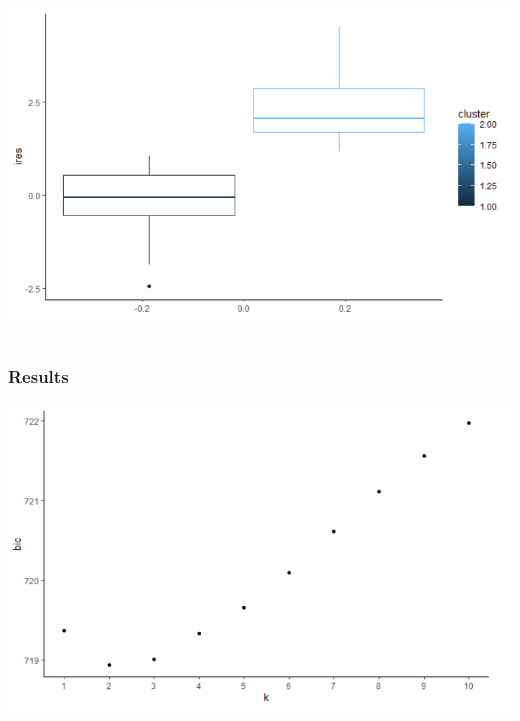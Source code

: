 \documentclass[hyperref={pdfpagelabels=false}]{beamer}
\begin{document}
\begin{frame}
\begin{columns}[t]
			\includegraphics[width = \textwidth]{fig/ChenBox.png}
		\end{columns}
\end{frame}

\begin{frame}
	\frametitle{Results}
		\includegraphics[width = \textwidth]{fig/ChenBic.png}\\

\end{frame}
\end{document}
